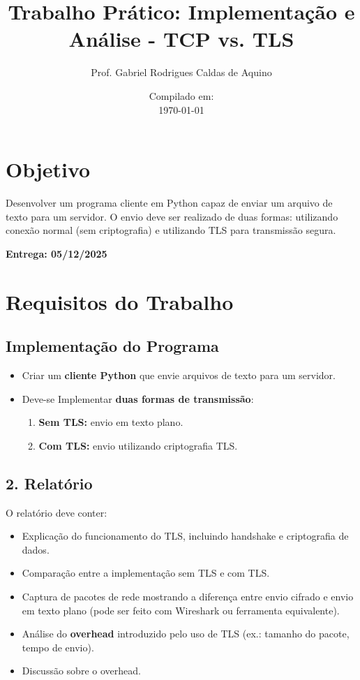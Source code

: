 \title{Trabalho Prático: Implementação e Análise - TCP vs. TLS}
\author{Prof. Gabriel Rodrigues Caldas de Aquino}
\date{Compilado em: \\ \today}




\maketitle

\section{Objetivo}
Desenvolver um programa cliente em Python capaz de enviar um arquivo de texto para um servidor.
O envio deve ser realizado de duas formas: utilizando conexão normal (sem criptografia) e utilizando TLS para transmissão segura.


\textbf{Entrega: 05/12/2025}

\section{Requisitos do Trabalho}

\subsection{Implementação do Programa}
\begin{itemize}
    \item Criar um \textbf{cliente Python} que envie arquivos de texto para um servidor.
    \item Deve-se Implementar \textbf{duas formas de transmissão}:
          \begin{enumerate}
              \item \textbf{Sem TLS:} envio em texto plano.
              \item \textbf{Com TLS:} envio utilizando criptografia TLS.
          \end{enumerate}
\end{itemize}

\subsection*{2. Relatório}
O relatório deve conter:
\begin{itemize}
    \item Explicação do funcionamento do TLS, incluindo handshake e criptografia de dados.
    \item Comparação entre a implementação sem TLS e com TLS.
    \item Captura de pacotes de rede mostrando a diferença entre envio cifrado e envio em texto plano (pode ser feito com Wireshark ou ferramenta equivalente).
    \item Análise do \textbf{overhead} introduzido pelo uso de TLS (ex.: tamanho do pacote, tempo de envio).
    \item Discussão sobre o overhead.

\end{itemize}

